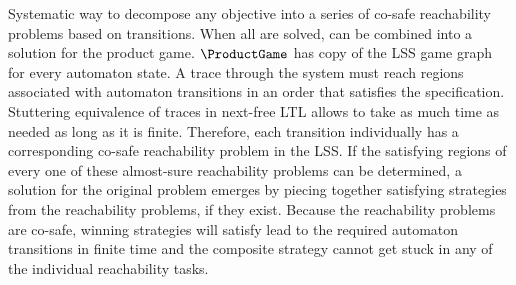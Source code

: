 \stopsubsection



\startsubsection[title={Transition-based Reachability Decomposition},reference=sec:refinement-transition-decomposition]

    Systematic way to decompose any objective into a series of co-safe reachability problems based on transitions.
    When all are solved, can be combined into a solution for the product game.
    $\ProductGame$ has copy of the LSS game graph for every automaton state.
    A trace through the system must reach regions associated with automaton transitions in an order that satisfies the specification.
    Stuttering equivalence of traces in next-free LTL allows to take as much time as needed as long as it is finite.
    Therefore, each transition individually has a corresponding co-safe reachability problem in the LSS.
    If the satisfying regions of every one of these almost-sure reachability problems can be determined, a solution for the original problem emerges by piecing together satisfying strategies from the reachability problems, if they exist.
    Because the reachability problems are co-safe, winning strategies will satisfy lead to the required automaton transitions in finite time and the composite strategy cannot get stuck in any of the individual reachability tasks.

